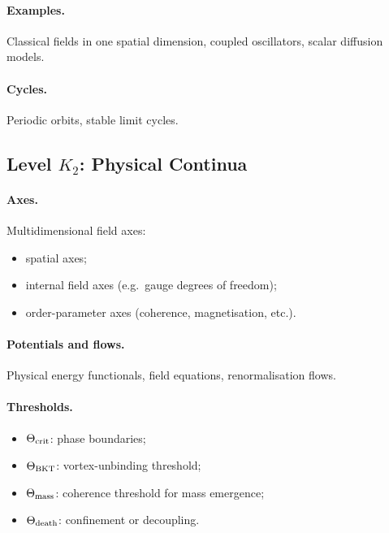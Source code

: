 \paragraph{Examples.}
Classical fields in one spatial dimension, coupled oscillators,
scalar diffusion models.

\paragraph{Cycles.}
Periodic orbits, stable limit cycles.


\subsection{Level \texorpdfstring{\texorpdfstring{$K_2$}{K\_2}}{K2}: Physical Continua}

\paragraph{Axes.}
Multidimensional field axes:
\begin{itemize}
    \item spatial axes;
    \item internal field axes (e.g.\ gauge degrees of freedom);
    \item order-parameter axes (coherence, magnetisation, etc.).
\end{itemize}

\paragraph{Potentials and flows.}
Physical energy functionals, field equations, renormalisation flows.

\paragraph{Thresholds.}
\begin{itemize}
    \item \(\Theta_{\rm crit}\): phase boundaries;
    \item \(\Theta_{\rm BKT}\): vortex-unbinding threshold;
    \item \(\Theta_{\rm mass}\): coherence threshold for mass emergence;
    \item \(\Theta_{\rm death}\): confinement or decoupling.
\end{itemize}

